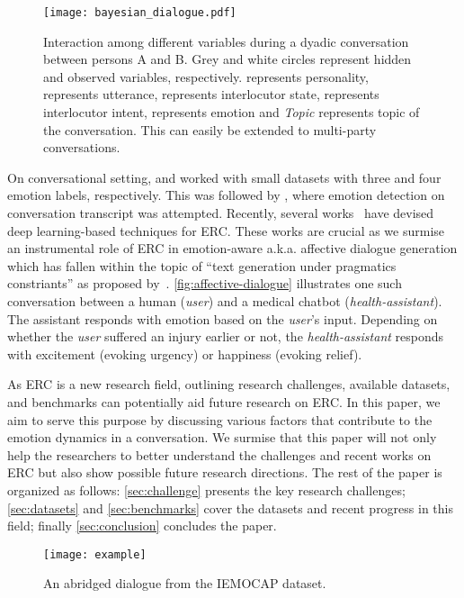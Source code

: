 \documentclass{IEEEtran}\usepackage[pdftex]{graphicx}
\begin{document}
	\begin{figure}
		\centering
		\texttt{[image: bayesian\_dialogue.pdf]}
		\caption{Interaction among different variables during a dyadic conversation between persons A and B. Grey and white circles represent hidden and observed variables, respectively.  represents personality,  represents utterance,  represents interlocutor state,  represents interlocutor intent,  represents emotion and \emph{Topic} represents topic of the conversation. This can easily be extended to multi-party conversations.}
		\label{fig:intent-modelling}
	\end{figure}
	
	On conversational setting, \citet{dmello} and \citet{yang} worked with small datasets with three and four emotion labels, respectively. This was followed by \citet{Y16-2006}, where emotion detection on conversation transcript was attempted. Recently, several
	works~\citep{hazarika2018icon,bae2019snu_ids} have devised deep learning-based techniques for ERC.
	These works are crucial as we surmise an instrumental role
	of ERC in emotion-aware a.k.a. affective dialogue generation which has fallen within the topic of ``text generation under pragmatics constriants'' as proposed by~\citet{hovy1987generating}. \cref{fig:affective-dialogue} illustrates
	one such conversation between a human ({\it user}) and a medical chatbot ({\it health-assistant}). The assistant responds with emotion based
	on the {\it user}'s input. Depending on whether the {\it user} suffered an injury earlier or not, the
	{\it health-assistant} responds with excitement (evoking urgency) or happiness (evoking relief).
	
	As ERC is a new research field, outlining research challenges, available datasets, and benchmarks can potentially aid future research on ERC. In this paper, we aim to serve this purpose by discussing various factors that contribute to the emotion dynamics in a conversation. We surmise that this paper will not only help the researchers to better understand the challenges and recent works on ERC but also show possible future research directions. The rest of the paper is organized as follows: \cref{sec:challenge} presents the key research challenges; \cref{sec:datasets} and \ref{sec:benchmarks} cover the datasets and recent progress in this field; finally \cref{sec:conclusion} concludes the paper. 
	\begin{figure}[h] 
		\centering 
		\small
		\texttt{[image: example]} 
		\caption{An abridged dialogue from the IEMOCAP dataset.}
		\label{fig:example}
	\end{figure}
	
\end{document}

